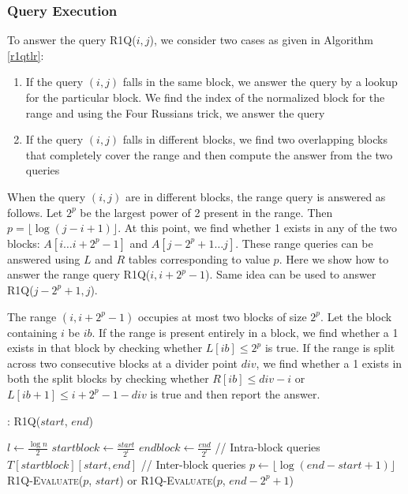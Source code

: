 \documentclass{article}
\begin{document}
\subsubsection{Query Execution}
To answer the query R1Q($i, j$), we consider two cases as given in Algorithm \ref{r1qtlr}:
\begin{enumerate}
\item If the query $(i, j)$ falls in the same block, we answer the query by a lookup for the particular block. We find the index of the normalized block for the range and using the Four Russians trick, we answer the query
\item If the query $(i, j)$ falls in different blocks, we find two overlapping blocks that completely cover the range and then compute the answer from the two queries
\end{enumerate}

When the query $(i, j)$ are in different blocks, the range query is answered as follows. Let $2^p$ be the largest power of 2 present in the range. Then $p = \lfloor \log (j-i+1) \rfloor$. At this point, we find whether 1 exists in any of the two blocks: $A[i \ldots i+2^p-1]$ and $A[j-2^p+1 \ldots j]$. These range queries can be answered using $L$ and $R$ tables corresponding to value $p$. Here we show how to answer the range query R1Q($i, i+2^p-1$). Same idea can be used to answer R1Q($j-2^p+1,j$).

The range $(i, i+2^p-1)$ occupies at most two blocks of size $2^p$. Let the block containing $i$ be $ib$. If the range is present entirely in a block, we find whether a 1 exists in that block by checking whether $L[ib] \le 2^p$ is true. If the range is split across two consecutive blocks at a divider point $div$, we find whether a 1 exists in both the split blocks by checking whether $R[ib] \le div - i$ or $L[ib+1] \le i+2^p-1 - div$ is true and then report the answer.

\begin{algorithm}
\begin{algorithmic}[1]
\caption{: \textsc{R1Q}($start$, $end$)}
\label{r1qtlr}
\medskip
\STATE $l \gets \frac{\log n}{2}$
\STATE $startblock \gets \frac{start}{2^l} $
\STATE $endblock \gets \frac{end}{2^l} $
\medskip
\STATE // Intra-block queries
	\RETURN $T[startblock][start, end]$
\ELSE
\STATE // Inter-block queries
\STATE $p \gets \lfloor \log (end-start+1) \rfloor$
\RETURN \textsc{R1Q-Evaluate}($p$, $start$) or \textsc{R1Q-Evaluate}($p$, $end-2^p+1$)
\ENDIF
\medskip
\end{algorithmic}
\end{algorithm}
\end{document}
